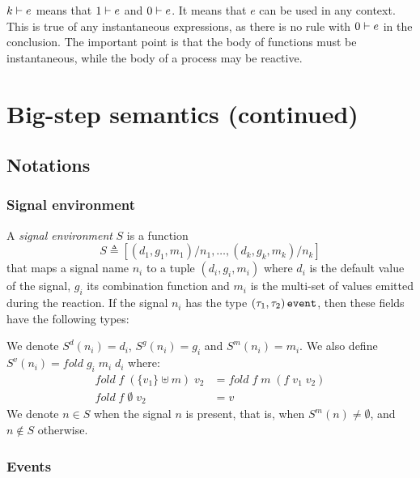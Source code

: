 \documentclass[9pt]{sigplanconf}
\newcommand{\deq}{\triangleq}
\begin{document}
$k \vdash e$ means that $1 \vdash e$ and $0 \vdash e$. It means that $e$ can be used in any context. This is true of any instantaneous expressions, as there is no rule with $0 \vdash e$ in the conclusion. The important point is that the body of functions must be instantaneous, while the body of a process may be reactive.


\section{Big-step semantics (continued)}
\label{sec:big_step_other}

\subsection{Notations}

\subsubsection*{Signal environment}

 A \emph{signal environment} $S$ is a function
\[ S \deq [ (d_1, g_1, m_1)/n_1, \dots, (d_k, g_k, m_k)/n_k ] \] 
that maps a signal name $n_i$ to a tuple $(d_i, g_i, m_i)$ where $d_i$ is the default value of the signal, $g_i$ its combination function and $m_i$ is the multi-set of values emitted during the reaction. If the signal $n_i$ has the type $(\tau_1, \tau_2) \,\mathtt{event}$, then these fields have the following types:
We denote $S^d(n_i) = d_i$, $S^g(n_i) = g_i$ and $S^m(n_i) = m_i$. We also define $S^v(n_i) = \mathit{fold}\; g_i\; m_i\; d_i$ where:
\begin{align*}
\mathit{fold}\; f\; (\{ v_1 \} \uplus m)\; v_2 &= \mathit{fold}\; f\; m\; (f\; v_1\; v_2) \\
\mathit{fold}\; f\; \emptyset\; v_2 &= v
\end{align*}
We denote $n \in S$ when the signal $n$ is present, that is, when $S^m(n) \neq \emptyset$, and $n \not\in S$ otherwise.

\subsubsection*{Events}
\end{document}
